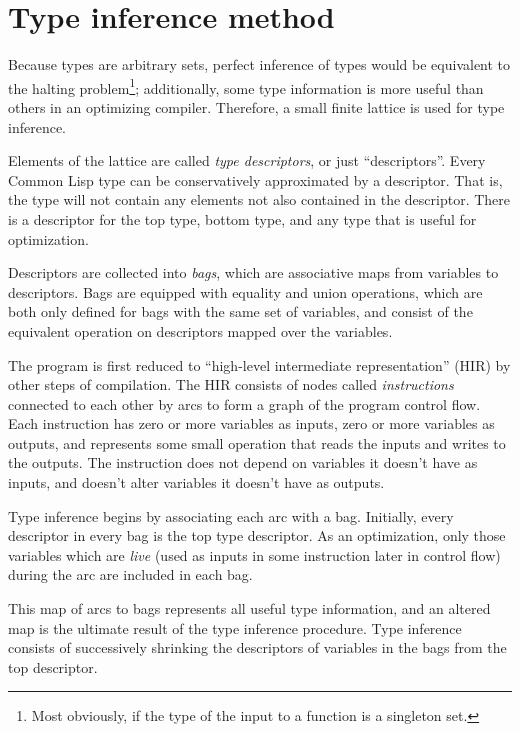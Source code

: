 \section{Type inference method}

Because \commonlisp{} types are arbitrary sets, perfect inference of \commonlisp{} types would be equivalent to the halting problem\footnote{Most obviously, if the type of the input to a function is a singleton set.}; additionally, some type information is more useful than others in an optimizing compiler. Therefore, a small finite lattice is used for type inference.

Elements of the lattice are called \textit{type descriptors}, or just ``descriptors''. Every Common Lisp type can be conservatively approximated by a descriptor. That is, the type will not contain any elements not also contained in the descriptor. There is a descriptor for the top type, bottom type, and any type that is useful for optimization.

Descriptors are collected into \textit{bags}, which are associative maps from variables to descriptors. Bags are equipped with equality and union operations, which are both only defined for bags with the same set of variables, and consist of the equivalent operation on descriptors mapped over the variables.

The program is first reduced to ``high-level intermediate representation'' (HIR) by other steps of compilation. The HIR consists of nodes called \textit{instructions} connected to each other by arcs to form a graph of the program control flow. Each instruction has zero or more variables as inputs, zero or more variables as outputs, and represents some small operation that reads the inputs and writes to the outputs. The instruction does not depend on variables it doesn't have as inputs, and doesn't alter variables it doesn't have as outputs.

Type inference begins by associating each arc with a bag. Initially, every descriptor in every bag is the top type descriptor. As an optimization, only those variables which are \textit{live} (used as inputs in some instruction later in control flow) during the arc are included in each bag.

This map of arcs to bags represents all useful type information, and an altered map is the ultimate result of the type inference procedure. Type inference consists of successively shrinking the descriptors of variables in the bags from the top descriptor.

